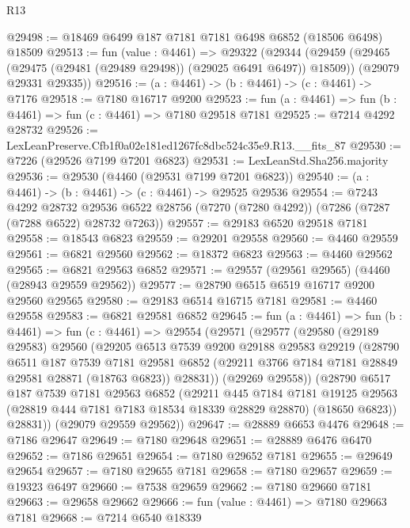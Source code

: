 \begin{lexlean}{R13}
\begin{coremodule}
@29498 := @18469 @6499 @187 @7181 @7181 @6498 @6852 (@18506 @6498) @18509
@29513 := fun (value : @4461) =>
  @29322
    (@29344
      (@29459 (@29465 (@29475 (@29481 (@29489 @29498)) (@29025 @6491 @6497)) @18509))
      (@29079 @29331 @29335))
@29516 := (a : @4461) -> (b : @4461) -> (c : @4461) -> @7176
@29518 := @7180 @16717 @9200
@29523 := fun (a : @4461) => fun (b : @4461) => fun (c : @4461) => @7180 @29518 @7181
@29525 := @7214 @4292 @28732
@29526 := LexLeanPreserve.Cfb1f0a02e181ed1267fc8dbc524c35e9.R13.__fits_87
@29530 := @7226 (@29526 @7199 @7201 @6823)
@29531 := LexLeanStd.Sha256.majority
@29536 := @29530 (@4460 (@29531 @7199 @7201 @6823))
@29540 := (a : @4461) -> (b : @4461) -> (c : @4461) -> @29525 @29536
@29554 := @7243
    @4292
    @28732
    @29536
    @6522
    @28756
    (@7270 (@7280 @4292))
    (@7286 (@7287 (@7288 @6522) @28732 @7263))
@29557 := @29183 @6520 @29518 @7181
@29558 := @18543 @6823
@29559 := @29201 @29558
@29560 := @4460 @29559
@29561 := @6821 @29560
@29562 := @18372 @6823
@29563 := @4460 @29562
@29565 := @6821 @29563 @6852
@29571 := @29557 (@29561 @29565) (@4460 (@28943 @29559 @29562))
@29577 := @28790 @6515 @6519 @16717 @9200 @29560 @29565
@29580 := @29183 @6514 @16715 @7181
@29581 := @4460 @29558
@29583 := @6821 @29581 @6852
@29645 := fun (a : @4461) =>
  fun (b : @4461) =>
  fun (c : @4461) =>
  @29554
    (@29571
      (@29577
        (@29580
          (@29189 @29583)
          @29560
          (@29205
            @6513
            @7539
            @9200
            @29188
            @29583
            @29219
            (@28790
              @6511
              @187
              @7539
              @7181
              @29581
              @6852
              (@29211 @3766 @7184 @7181 @28849 @29581 @28871 (@18763 @6823))
              @28831))
          (@29269 @29558))
        (@28790
          @6517
          @187
          @7539
          @7181
          @29563
          @6852
          (@29211
            @445
            @7184
            @7181
            @19125
            @29563
            (@28819 @444 @7181 @7183 @18534 @18339 @28829 @28870)
            (@18650 @6823))
          @28831))
      (@29079 @29559 @29562))
@29647 := @28889 @6653 @4476
@29648 := @7186 @29647
@29649 := @7180 @29648
@29651 := @28889 @6476 @6470
@29652 := @7186 @29651
@29654 := @7180 @29652 @7181
@29655 := @29649 @29654
@29657 := @7180 @29655 @7181
@29658 := @7180 @29657
@29659 := @19323 @6497
@29660 := @7538 @29659
@29662 := @7180 @29660 @7181
@29663 := @29658 @29662
@29666 := fun (value : @4461) => @7180 @29663 @7181
@29668 := @7214 @6540 @18339

\end{coremodule}
\end{lexlean}
